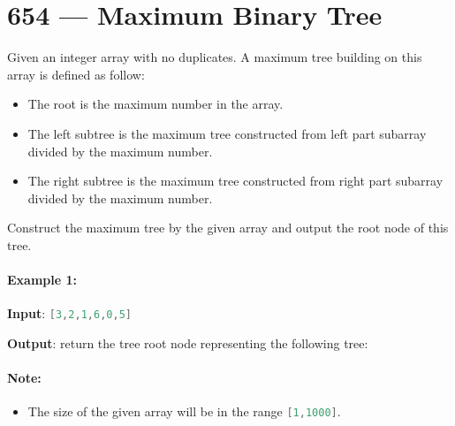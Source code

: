 \section{654 --- Maximum Binary Tree}
Given an integer array with no duplicates. A maximum tree building on this array is defined as follow:

\begin{itemize}
\item The root is the maximum number in the array.
\item The left subtree is the maximum tree constructed from left part subarray divided by the maximum number.
\item The right subtree is the maximum tree constructed from right part subarray divided by the maximum number.

\end{itemize}
Construct the maximum tree by the given array and output the root node of this tree.

\paragraph{Example 1:}

\begin{flushleft}
\textbf{Input}: \lstinline[language=C++, basicstyle=\small\ttfamily, keywordstyle=\bfseries\color{green!40!black}]|[3,2,1,6,0,5]|

\textbf{Output}: return the tree root node representing the following tree:

\begin{figure}[H]
\end{figure}
\end{flushleft}

\paragraph{Note:}

\begin{itemize}
\item The size of the given array will be in the range \lstinline[language=Java, basicstyle=\small\ttfamily, keywordstyle=\bfseries\color{green!40!black}]|[1,1000]|.
\end{itemize}

